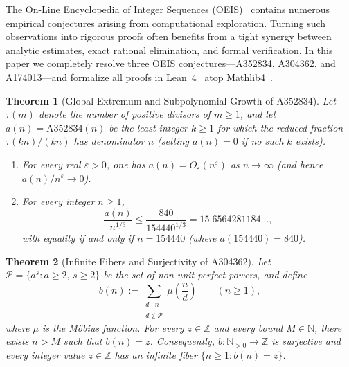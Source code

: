 \documentclass[11pt,a4paper]{article}
\newtheorem{theorem}{Theorem}[section]
\theoremstyle{definition}
\theoremstyle{remark}
\newcommand{\N}{\mathbb{N}}
\newcommand{\Z}{\mathbb{Z}}
\begin{document}
The On-Line Encyclopedia of Integer Sequences (OEIS)~\cite{oeis} contains numerous empirical conjectures arising from computational exploration. Turning such observations into rigorous proofs often benefits from a tight synergy between analytic estimates, exact rational elimination, and formal verification. In this paper we completely resolve three OEIS conjectures—A352834, A304362, and A174013—and formalize all proofs in Lean~4~\cite{lean4} atop Mathlib4~\cite{mathlib4}.

\begin{theorem}[Global Extremum and Subpolynomial Growth of A352834]\label{thm:a352834}
Let $\tau(m)$ denote the number of positive divisors of $m \ge 1$, and let $a(n) = \mathrm{A352834}(n)$ be the least integer $k \ge 1$ for which the reduced fraction $\tau(kn)/(kn)$ has denominator $n$ (setting $a(n)=0$ if no such $k$ exists).
\begin{enumerate}
  \item[(a)] For every real $\varepsilon > 0$, one has $a(n) = O_\varepsilon(n^\varepsilon)$ as $n \to \infty$ (and hence $a(n)/n^\varepsilon \to 0$).
  \item[(b)] For every integer $n \ge 1$,
  \[
    \frac{a(n)}{n^{1/3}} \le \frac{840}{154440^{1/3}} = 15.6564281184\dots,
  \]
  with equality if and only if $n = 154440$ (where $a(154440) = 840$).
\end{enumerate}
\end{theorem}

\begin{theorem}[Infinite Fibers and Surjectivity of A304362]\label{thm:a304362}
Let $\mathcal{P} = \{a^s : a \ge 2,\, s \ge 2\}$ be the set of non-unit perfect powers, and define
\[
  b(n) := \sum_{\substack{d \mid n \\ d \notin \mathcal{P}}} \mu\!\left(\frac{n}{d}\right) \qquad (n \ge 1),
\]
where $\mu$ is the Möbius function. For every $z \in \Z$ and every bound $M \in \N$, there exists $n > M$ such that $b(n) = z$. Consequently, $b : \N_{>0} \to \Z$ is surjective and every integer value $z \in \Z$ has an infinite fiber $\{n \ge 1 : b(n) = z\}$.
\end{theorem}
\end{document}
